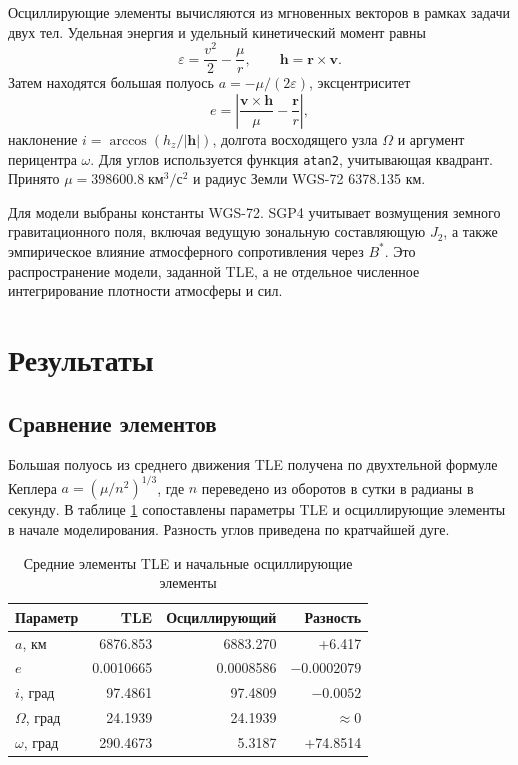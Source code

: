 \documentclass[12pt,a4paper]{article}
\begin{document}
    Осциллирующие элементы вычисляются из мгновенных векторов в рамках задачи двух тел. Удельная
    энергия и удельный кинетический момент равны
    \[
    \varepsilon=\frac{v^2}{2}-\frac{\mu}{r},\qquad
    \mathbf h=\mathbf r\times\mathbf v.
    \]
    Затем находятся большая полуось $a=-\mu/(2\varepsilon)$, эксцентриситет
    \[
    e=\left|\frac{\mathbf v\times\mathbf h}{\mu}-\frac{\mathbf r}{r}\right|,
    \]
    наклонение $i=\arccos(h_z/|\mathbf h|)$, долгота восходящего узла $\Omega$ и аргумент перицентра
    $\omega$. Для углов используется функция \texttt{atan2}, учитывающая квадрант. Принято
    $\mu=398600.8\;\mathrm{км^3/с^2}$ и радиус Земли WGS-72 6378.135 км.

    Для модели выбраны константы WGS-72. SGP4 учитывает возмущения земного гравитационного поля,
    включая ведущую зональную составляющую $J_2$, а также эмпирическое влияние атмосферного
    сопротивления через $B^*$. Это распространение модели, заданной TLE, а не отдельное
    численное интегрирование плотности атмосферы и сил.

    \section{Результаты}

    \subsection{Сравнение элементов}

    Большая полуось из среднего движения TLE получена по двухтельной формуле Кеплера
    $a=(\mu/n^2)^{1/3}$, где $n$ переведено из оборотов в сутки в радианы в секунду. В таблице
    \ref{tab:compare} сопоставлены параметры TLE и осциллирующие элементы в начале моделирования.
    Разность углов приведена по кратчайшей дуге.

    \begin{table}[H]
        \centering
        \caption{Средние элементы TLE и начальные осциллирующие элементы}
        \label{tab:compare}
        \begin{tabular}{lrrr}
            \toprule
            Параметр & TLE & Осциллирующий & Разность \\
            \midrule
            $a$, км & 6876.853 & 6883.270 & +6.417 \\
            $e$ & 0.0010665 & 0.0008586 & $-0.0002079$ \\
            $i$, град & 97.4861 & 97.4809 & $-0.0052$ \\
            $\Omega$, град & 24.1939 & 24.1939 & $\approx 0$ \\
            $\omega$, град & 290.4673 & 5.3187 & +74.8514 \\
            \bottomrule
        \end{tabular}
    \end{table}
\end{document}
